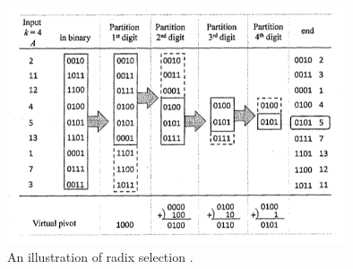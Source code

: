 \begin{figure}[ht!]
\centering
\includegraphics[width=100mm]{../gfx/Radix_select.png}

\caption{An illustration of radix selection \cite{cayman:2012}.}
\label{fig:radix_select}
\end{figure}










